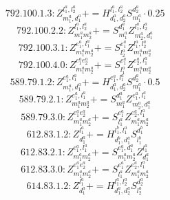 \documentclass[letterpaper,10pt,fleqn,leqno,onecolumn]{article}
\begin{document}
\begin{equation} \;\;\;\;\;\;  792.100.1.3: Z^{l_{1}^{a},l_{2}^{a}}_{m_{1}^{a},d_{1}^{a}}+=H^{l_{1}^{a},l_{2}^{a}}_{d_{1}^{a},d_{2}^{a}}S^{d_{2}^{a}}_{m_{1}^{a}}\cdot 0.25 \end{equation}
\begin{equation} \;\;\;\;\;\;  792.100.2.2: Z^{l_{1}^{a},l_{2}^{a}}_{m_{1}^{a}m_{2}^{a}}+=S^{d_{1}^{a}}_{m_{1}^{a}}Z^{l_{1}^{a},l_{2}^{a}}_{m_{2}^{a},d_{1}^{a}} \end{equation}
\begin{equation} \;\;\;\;\;\;  792.100.3.1: Z^{e_{1}^{a},l_{1}^{a}}_{m_{1}^{a}m_{2}^{a}}+=S^{e_{1}^{a}}_{l_{2}^{a}}Z^{l_{1}^{a},l_{2}^{a}}_{m_{1}^{a}m_{2}^{a}} \end{equation}
\begin{equation} \;\;\;\;\;\;  792.100.4.0: Z^{e_{1}^{a}e_{2}^{a}}_{m_{1}^{a}m_{2}^{a}}+=S^{e_{1}^{a}}_{l_{1}^{a}}Z^{e_{2}^{a},l_{1}^{a}}_{m_{1}^{a}m_{2}^{a}} \end{equation}
\begin{equation} \;\;\;\;\;\;  589.79.1.2: Z^{e_{1}^{a},l_{1}^{a}}_{m_{1}^{a},d_{1}^{a}}+=H^{e_{1}^{a},l_{1}^{a}}_{d_{1}^{a},d_{2}^{a}}S^{d_{2}^{a}}_{m_{1}^{a}}\cdot 0.5 \end{equation}
\begin{equation} \;\;\;\;\;\;  589.79.2.1: Z^{e_{1}^{a},l_{1}^{a}}_{m_{1}^{a}m_{2}^{a}}+=S^{d_{1}^{a}}_{m_{1}^{a}}Z^{e_{1}^{a},l_{1}^{a}}_{m_{2}^{a},d_{1}^{a}} \end{equation}
\begin{equation} \;\;\;\;\;\;  589.79.3.0: Z^{e_{1}^{a}e_{2}^{a}}_{m_{1}^{a}m_{2}^{a}}+=S^{e_{1}^{a}}_{l_{1}^{a}}Z^{e_{2}^{a},l_{1}^{a}}_{m_{1}^{a}m_{2}^{a}} \end{equation}
\begin{equation} \;\;\;\;\;\;  612.83.1.2: Z^{l_{1}^{a}}_{d_{1}^{a}}+=H^{l_{1}^{b},l_{1}^{a}}_{d_{1}^{b},d_{1}^{a}}S^{d_{1}^{b}}_{l_{1}^{b}} \end{equation}
\begin{equation} \;\;\;\;\;\;  612.83.2.1: Z^{e_{1}^{a},l_{1}^{a}}_{m_{1}^{a}m_{2}^{a}}+=S^{e_{1}^{a},d_{1}^{a}}_{m_{1}^{a}m_{2}^{a}}Z^{l_{1}^{a}}_{d_{1}^{a}} \end{equation}
\begin{equation} \;\;\;\;\;\;  612.83.3.0: Z^{e_{1}^{a}e_{2}^{a}}_{m_{1}^{a}m_{2}^{a}}+=S^{e_{1}^{a}}_{l_{1}^{a}}Z^{e_{2}^{a},l_{1}^{a}}_{m_{1}^{a}m_{2}^{a}} \end{equation}
\begin{equation} \;\;\;\;\;\;  614.83.1.2: Z^{l_{1}^{a}}_{d_{1}^{a}}+=H^{l_{1}^{a},l_{2}^{a}}_{d_{1}^{a},d_{2}^{a}}S^{d_{2}^{a}}_{l_{2}^{a}} \end{equation}
\end{document}

